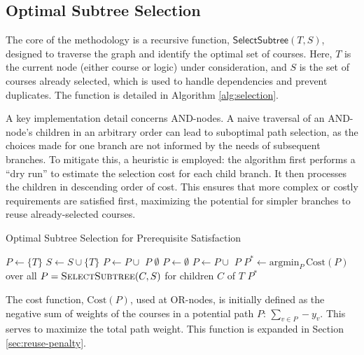 \documentclass[11pt]{article}
\begin{document}
\subsection{Optimal Subtree Selection}

The core of the methodology is a recursive function, $\mathsf{SelectSubtree}(T, S)$, designed to traverse the graph and identify the optimal set of courses. Here, $T$ is the current node (either course or logic) under consideration, and $S$ is the set of courses already selected, which is used to handle dependencies and prevent duplicates. The function is detailed in Algorithm \ref{alg:selection}.

A key implementation detail concerns AND-nodes. A naive traversal of an AND-node's children in an arbitrary order can lead to suboptimal path selection, as the choices made for one branch are not informed by the needs of subsequent branches. To mitigate this, a heuristic is employed: the algorithm first performs a ``dry run'' to estimate the selection cost for each child branch. It then processes the children in descending order of cost. This ensures that more complex or costly requirements are satisfied first, maximizing the potential for simpler branches to reuse already-selected courses.

\begin{algorithm}[H]
\caption{Optimal Subtree Selection for Prerequisite Satisfaction}
\label{alg:selection}
\begin{algorithmic}[1]
            \State $P \gets \{T\}$
            \State $S \gets S \cup \{T\}$
                \State $P \gets P \cup$ 
            \EndFor
            \State\Return $P$
        \Else
            \State\Return $\emptyset$
        \EndIf
        \State $P \gets \emptyset$
            \State $P \gets P \cup$ 
        \EndFor
        \State\Return $P$
        \State $P^* \gets \text{argmin}_P\, \mathrm{Cost}(P)$ over all $P = \Call{SelectSubtree}{C, S}$ for children $C$ of $T$
        \State\Return $P^*$
    \EndIf
\EndFunction
\end{algorithmic}
\end{algorithm}

The cost function, $\mathrm{Cost}(P)$, used at OR-nodes, is initially defined as the negative sum of weights of the courses in a potential path $P$: $\sum_{v \in P} -y_v$. This serves to maximize the total path weight. This function is expanded in Section \ref{sec:reuse-penalty}.
\end{document}
